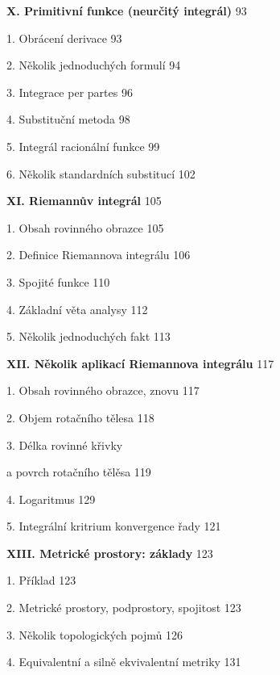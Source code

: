 \documentclass[12pt]{article}
\begin{document}
 \bigskip
 
 {\bf X. Primitivní funkce (neurčitý integrál)} \hskip10mm 93
 
 \hskip5mm 1. Obrácení derivace \hskip10mm 93
 
 \hskip5mm 2. Několik jednoduchých formulí  \hskip10mm 94
 
 \hskip5mm 3. Integrace per partes  \hskip10mm 96
 
 \hskip5mm 4. Substituční metoda  \hskip10mm 98
 
 \hskip5mm 5. Integrál racionální funkce \hskip10mm 99
 
 \hskip5mm 6. Několik standardních substitucí \hskip10mm 102
 
 \newpage
 
 {\bf XI. Riemannův integrál} \hskip10mm 105
 
 \hskip5mm 1. Obsah rovinného obrazce \hskip10mm 105
 
 \hskip5mm 2. Definice Riemannova integrálu \hskip10mm 106
 
 \hskip5mm 3. Spojité funkce  \hskip10mm 110
 
 \hskip5mm 4. Základní věta analysy \hskip10mm 112
 
 \hskip5mm  5. N\v ekolik jednoduch\'ych fakt \hskip10mm 113
 
 \bigskip
 
 {\bf XII. Několik aplikací Riemannova integrálu} \hskip10mm 117
 
  \hskip5mm 1.  Obsah rovinného obrazce, znovu \hskip10mm 117
  
   \hskip5mm 2. Objem rotačního tělesa \hskip10mm 118
   
    \hskip5mm 3. Délka rovinné křivky
    
    \hskip10mm  a povrch rotačního tělěsa  \hskip10mm 119
    
     \hskip5mm 4. Logaritmus \hskip10mm 129
     
      \hskip5mm 5. Integrální kritrium konvergence řady \hskip10mm 121
      
      \bigskip
      
{\bf XIII. Metrické prostory: základy} \hskip10mm 123

 \hskip5mm 1.  Příklad \hskip10mm 123
 
 \hskip5mm 2.  Metrické prostory, podprostory, spojitost \hskip10mm 123
 
 \hskip5mm 3.  Několik topologických pojmů \hskip10mm 126
 
 \hskip5mm 4.  Equivalentní a silně ekvivalentní metriky \hskip10mm 131
 
\end{document}

